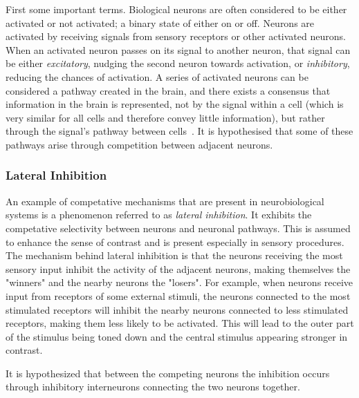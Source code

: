         First some important terms. Biological neurons are often considered to be either activated or not activated; a binary state of either on or off. Neurons are activated by receiving signals from sensory receptors or other activated neurons. When an activated neuron passes on its signal to another neuron, that signal can be either \textit{excitatory}, nudging the second neuron towards activation, or \textit{inhibitory}, reducing the chances of activation.  A series of activated neurons can be considered a pathway created in the brain, and there exists a consensus that information in the brain is represented, not by the signal within a cell (which is very similar for all cells and therefore convey little information), but rather through the signal's pathway between cells~\citep{Chen}. It is hypothesised that some of these pathways arise through competition between adjacent neurons. 
        
        \subsubsection{Lateral Inhibition}

            An example of competative mechanisms that are present in neurobiological systems is a phenomenon referred to as \textit{lateral inhibition}. It exhibits the competative selectivity between neurons and neuronal pathways. This is assumed to enhance the sense of contrast and is present especially in sensory procedures.  The mechanism behind lateral inhibition is that the neurons receiving the most sensory input inhibit the activity of the adjacent neurons, making themselves the "winners" and the nearby neurons the "losers". For example, when neurons receive input from receptors of some external stimuli, the neurons connected to the most stimulated receptors will inhibit the nearby neurons connected to less stimulated receptors, making them less likely to be activated. This will lead to the outer part of the stimulus being toned down and the central stimulus appearing stronger in contrast. 
            
            It is hypothesized that between the competing neurons the inhibition occurs through inhibitory interneurons connecting the two neurons together.
            


